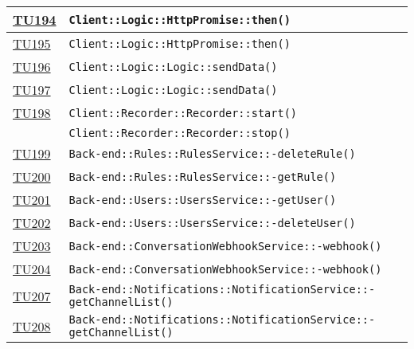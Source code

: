 \begin{longtable}{|>{\centering}m{1cm}|m{12cm}<{\centering}|}
\hyperlink{TU194}{TU194} & \texttt{Client::Logic::HttpPromise::then()}\\ \hline

\hyperlink{TU195}{TU195} & \texttt{Client::Logic::HttpPromise::then()}\\ \hline

\hyperlink{TU196}{TU196} & \texttt{Client::Logic::Logic::sendData()}\\ \hline

\hyperlink{TU197}{TU197} & \texttt{Client::Logic::Logic::sendData()}\\ \hline

\hyperlink{TU198}{TU198} & \texttt{Client::Recorder::Recorder::start()}\\ & \texttt{Client::Recorder::Recorder::stop()}\\ \hline

\hyperlink{TU199}{TU199} & \texttt{Back-end::Rules::RulesService::-\linebreak deleteRule()}\\ \hline

\hyperlink{TU200}{TU200} & \texttt{Back-end::Rules::RulesService::-\linebreak getRule()}\\ \hline

\hyperlink{TU201}{TU201} & \texttt{Back-end::Users::UsersService::-\linebreak getUser()}\\ \hline

\hyperlink{TU202}{TU202} & \texttt{Back-end::Users::UsersService::-\linebreak deleteUser()}\\ \hline

\hyperlink{TU203}{TU203} & \texttt{Back-end::ConversationWebhookService::-\linebreak webhook()}\\ \hline

\hyperlink{TU204}{TU204} & \texttt{Back-end::ConversationWebhookService::-\linebreak webhook()}\\ \hline

\hyperlink{TU207}{TU207} & \texttt{Back-end::Notifications::NotificationService::-\linebreak getChannelList()}\\ \hline

\hyperlink{TU208}{TU208} & \texttt{Back-end::Notifications::NotificationService::-\linebreak getChannelList()}\\ \hline


\end{longtable}
